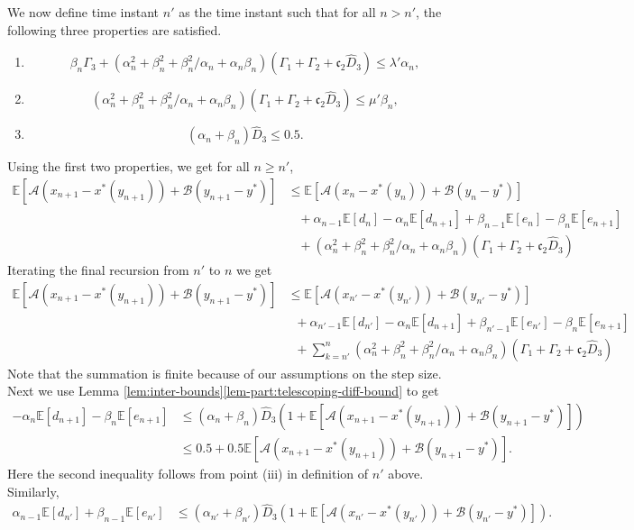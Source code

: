 \documentclass[letterpaper, 10 pt, conference]{ieeeconf}  %
\theoremstyle{definition}
\theoremstyle{plain}
\newcommand{\xstar}{x^*}
\newcommand{\ystar}{y^*}
\newcommand{\hD}{\hat{D}}
\newcommand{\EE}{\mathbb{E}}
\newcommand{\Acal}{\mathcal{A}}
\newcommand{\Bcal}{\mathcal{B}}
\newcommand{\cc}{\mathfrak{c}}
\begin{document}
    We now define time instant $n'$ as the time instant such that for all $n>n'$, the following three properties are satisfied.
    \begin{enumerate}[label=(\roman*)]
        \item $$\beta_n\Gamma_3+(\alpha_n^2+\beta_n^2+\beta_n^2/\alpha_n+\alpha_n\beta_n)(\Gamma_1+\Gamma_2+\cc_2\hD_3)\leq \lambda'\alpha_n,$$
        \item $$(\alpha_n^2+\beta_n^2+\beta_n^2/\alpha_n+\alpha_n\beta_n)(\Gamma_1+\Gamma_2+\cc_2\hD_3)\leq \mu'\beta_n,$$
        \item $$(\alpha_n+\beta_n)\hD_3\leq 0.5.$$
    \end{enumerate}
    Using the first two properties, we get for all $n\geq n'$,
        \begin{align*}
        \EE[\Acal(x_{n+1}-\xstar(y_{n+1}))+\Bcal(y_{n+1}-\ystar)]&\leq  \EE[\Acal(x_{n}-\xstar(y_n))+\Bcal(y_{n}-\ystar)]\\
        &\;\;\;+\alpha_{n-1}\EE[d_n]-\alpha_n\EE[d_{n+1}]+\beta_{n-1}\EE[e_n]-\beta_n\EE[e_{n+1}]\\
        &\;\;\;+(\alpha_n^2+\beta_n^2+\beta_n^2/\alpha_n+\alpha_n\beta_n)(\Gamma_1+\Gamma_2+\cc_2\hD_3)
    \end{align*}
    Iterating the final recursion from $n'$ to $n$ we get
    \begin{align*}
        \EE[\Acal(x_{n+1}-\xstar(y_{n+1}))+\Bcal(y_{n+1}-\ystar)]&\leq \EE[\Acal(x_{n'}-\xstar(y_{n'}))+\Bcal(y_{n'}-\ystar)]\\
        &\;\;+\alpha_{n'-1}\EE[d_{n'}]-\alpha_{n}\EE[d_{n+1}]+\beta_{n'-1}\EE[e_{n'}]-\beta_n\EE[e_{n+1}]\\
        &\;\;+\sum_{k=n'}^n(\alpha_n^2+\beta_n^2+\beta_n^2/\alpha_n+\alpha_n\beta_n)(\Gamma_1+\Gamma_2+\cc_2\hD_3)
    \end{align*}
    Note that the summation is finite because of our assumptions on the step size. Next we use Lemma \ref{lem:inter-bounds}\ref{lem-part:telescoping-diff-bound} to get
    \begin{align*}
        -\alpha_n\EE[d_{n+1}]-\beta_n\EE[e_{n+1}]&\leq (\alpha_n+\beta_n)\hD_3(1+\EE[\Acal(x_{n+1}-\xstar(y_{n+1}))+\Bcal(y_{n+1}-\ystar)])\\
        &\leq 0.5+0.5\EE[\Acal(x_{n+1}-\xstar(y_{n+1}))+\Bcal(y_{n+1}-\ystar)].
    \end{align*}
    Here the second inequality follows from point (iii) in definition of $n'$ above. Similarly,
    \begin{align*}
        \alpha_{n-1}\EE[d_{n'}]+\beta_{n-1}\EE[e_{n'}]&\leq (\alpha_{n'}+\beta_{n'})\hD_3(1+\EE[\Acal(x_{n'}-\xstar(y_{n'}))+\Bcal(y_{n'}-\ystar)]).
    \end{align*}
\end{document}
